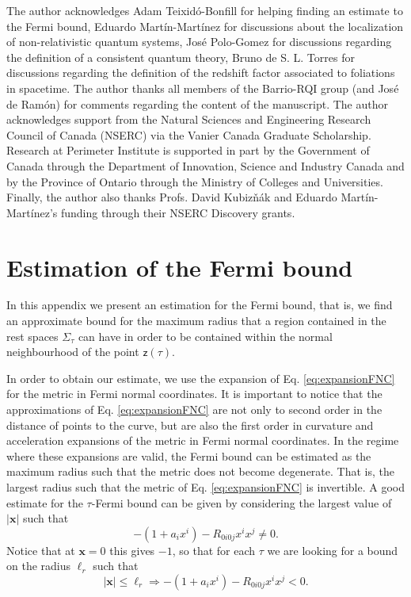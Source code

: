 \documentclass[prd,twocolumn,superscriptaddress,floatfix,amsmath,amssymb,amsfonts,longbibliography,nofootinbib]{revtex4-1}
\newcommand{\mf}{\mathsf}%
\begin{document}
The author acknowledges Adam Teixid\'o-Bonfill for helping finding an estimate to the Fermi bound, Eduardo Mart\'in-Mart\'inez for discussions about the localization of non-relativistic quantum systems, Jos\'e Polo-Gomez for discussions regarding the definition of a consistent quantum theory, Bruno de S. L. Torres for discussions regarding the definition of the redshift factor associated to foliations in spacetime. The author thanks all members of the Barrio-RQI group (and Jos\'e de Ram\'on) for comments regarding the content of the manuscript. The author acknowledges support from the Natural Sciences and Engineering Research Council of Canada (NSERC) via the Vanier Canada Graduate Scholarship. Research at Perimeter Institute is supported in part by the Government of Canada through the Department of Innovation, Science and Industry Canada and by the Province of Ontario through the Ministry of Colleges and Universities. Finally, the author also thanks Profs. David Kubiz\v{n}\'ak and Eduardo Mart\'in-Mart\'inez’s funding through their NSERC Discovery grants.


\appendix



\section{Estimation of the Fermi bound}\label{app:fermi}

In this appendix we present an estimation for the Fermi bound, that is, we find an approximate bound for the maximum radius that a region contained in the rest spaces $\Sigma_\tau$ can have in order to be contained within the normal neighbourhood of the point $\mf z(\tau)$.

In order to obtain our estimate, we use the expansion of Eq. \eqref{eq:expansionFNC} for the
metric in Fermi normal coordinates. It is important to notice that the approximations of Eq. \eqref{eq:expansionFNC} are not only to second order in the distance of points to the curve, but are also the first order in curvature and acceleration expansions of the metric in Fermi normal coordinates. In the regime where these expansions are valid, the Fermi bound can be estimated as the maximum radius such that the metric does not become degenerate. That is, the largest radius such that the metric of Eq. \eqref{eq:expansionFNC}
is invertible. A good estimate for the $\tau$-Fermi bound can be given by considering the largest value of $|\bm x|$ such that 
\begin{equation}
    -(1+a_i x^i) - R_{0i0j}x^ix^j \neq 0.
\end{equation}
Notice that at $\bm x = 0$ this gives $-1$, so that for each $\tau$ we are looking for a bound on the radius $\ell_r$ such that 
\begin{equation}\label{eq:condition}
    |\bm x| \leq \ell_r \Rightarrow -(1+a_i x^i) - R_{0i0j}x^ix^j < 0. 
\end{equation}
\end{document}
